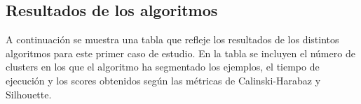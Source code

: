 	\subsection{Resultados de los algoritmos}
	A continuación se muestra una tabla que refleje los resultados de los distintos algoritmos para este primer caso de estudio. En la tabla se incluyen el número de clusters en los que el algoritmo ha segmentado los ejemplos, el tiempo de ejecución y los scores obtenidos según las métricas de Calinski-Harabaz y Silhouette.
	
	\begin{table}[H]
		\centering
		\caption{Resultados de los algoritmos de clustering para el primer caso de estudio.}
	\end{table}
	
